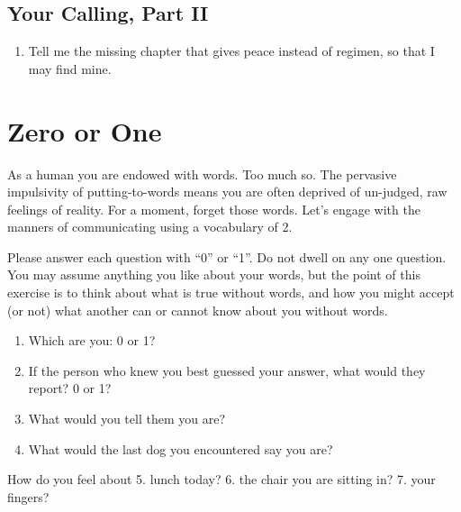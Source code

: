 \documentclass[
]{book}
\providecommand{\tightlist}{%
  \setlength{\itemsep}{0pt}\setlength{\parskip}{0pt}}
\begin{document}
\hypertarget{your-calling-part-ii}{%
\section{Your Calling, Part II}\label{your-calling-part-ii}}

\begin{enumerate}
\def\labelenumi{\arabic{enumi}.}
\setcounter{enumi}{60}
\tightlist
\item
  Tell me the missing chapter
  that gives peace instead of regimen,
  so that I may find mine.
\end{enumerate}

\hypertarget{appendix-lessons}{%
\appendix}


\hypertarget{zero-or-one}{%
\chapter{Zero or One}\label{zero-or-one}}

As a human you are endowed with words.
Too much so. The pervasive impulsivity of putting-to-words means you are often deprived
of un-judged, raw feelings of reality.
For a moment, forget those words.
Let's engage with the manners of communicating
using a vocabulary of 2.

Please answer each question with ``0'' or ``1''.
Do not dwell on any one question.
You may assume anything you like about your words,
but the point of this exercise is to think about what is true without words, and how you might accept (or not)
what another can or cannot know about you without words.

\begin{enumerate}
\def\labelenumi{\arabic{enumi}.}
\tightlist
\item
  Which are you: 0 or 1?
\item
  If the person who knew you best guessed your answer,
  what would they report? 0 or 1?
\item
  What would you tell them you are?
\item
  What would the last dog you encountered say you are?
\end{enumerate}

How do you feel about
5. lunch today?
6. the chair you are sitting in?
7. your fingers?
\end{document}
